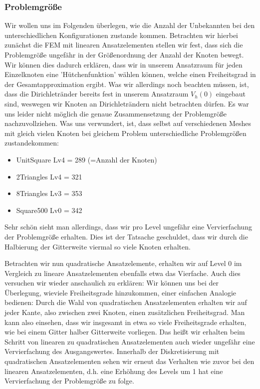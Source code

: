 \subsubsection*{Problemgröße}
Wir wollen uns im Folgenden überlegen, wie die Anzahl der Unbekannten bei den unterschiedlichen Konfigurationen zustande kommen. 
Betrachten wir hierbei zunächst die FEM mit linearen Ansatzelementen stellen wir fest, dass sich die Problemgröße ungefähr in der Größenordnung der Anzahl der Knoten bewegt.
Wir können dies dadurch erklären, dass wir in unserem Ansatzraum für jeden Einzelknoten eine 'Hütchenfunktion' wählen können, welche einen Freiheitsgrad in der Gesamtapproximation ergibt.
Was wir allerdings noch beachten müssen, ist, dass die Dirichletränder bereits fest in unserem Ansatzraum $V_h(0)$ eingebaut sind, weswegen wir Knoten an Dirichleträndern nicht betrachten dürfen.
Es war uns leider nicht möglich die genaue Zusammensetzung der Problemgröße nachzuvollziehen. Was uns verwundert, ist, dass selbst auf verschiedenen Meshes mit gleich vielen Knoten bei gleichem Problem unterschiedliche Problemgrößen zustandekommen:
\begin{itemize}
  \item UnitSquare Lv4 = 289 (=Anzahl der Knoten)
  \item 2Triangles Lv4 = 321
  \item 8Triangles Lv3 = 353
  \item Square500  Lv0 = 342
\end{itemize} 
Sehr schön sieht man allerdings, dass wir pro Level ungefähr eine Vervierfachung der Problemgröße erhalten. Dies ist der Tatsache geschuldet, dass wir durch die Halbierung der Gitterweite viermal so viele Knoten erhalten.

Betrachten wir nun quadratische Ansatzelemente, erhalten wir auf Level 0 im Vergleich zu lineare Ansatzelementen ebenfalls etwa das Vierfache. Auch dies versuchen wir wieder anschaulich zu erklären: 
Wir können uns bei der Überlegung, wieviele Freiheitsgrade hinzukommen, einer einfachen Analogie bedienen: 
Durch die Wahl von quadratischen Ansatzelementen erhalten wir auf jeder Kante, also zwischen zwei Knoten, einen zusätzlichen Freiheitsgrad. Man kann also einsehen, dass wir insgesamt in etwa so viele Freiheitsgrade erhalten, wie bei einem Gitter halber Gitterweite vorliegen. Das heißt wir erhalten beim Schritt von linearen zu quadratischen Ansatzelementen auch wieder ungefähr eine Vervierfachung des Ausgangswertes. Innerhalb der Diskretisierung mit quadratischen Ansatzelementen sehen wir erneut das Verhalten wie zuvor bei den linearen Ansatzelementen, d.h. eine Erhöhung des Levels um 1 hat eine Vervierfachung der Problemgröße zu folge.

